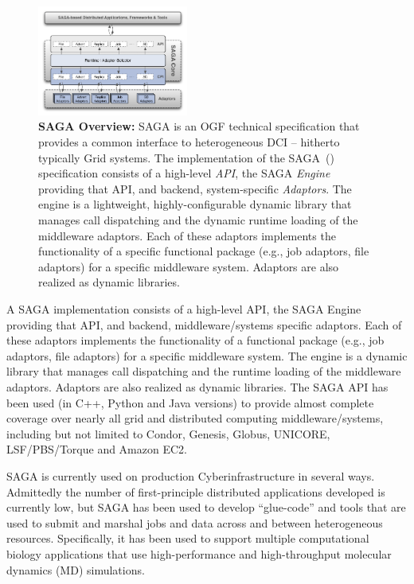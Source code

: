 \documentclass{sig-alternate}
\begin{document}
\begin{figure}[t]
\centering
\includegraphics[width=0.44\textwidth]{./figs/saga-architecture-1}
\caption{\textbf{SAGA Overview: } SAGA is an OGF technical
  specification that provides a common interface to heterogeneous DCI
  -- hitherto typically Grid systems.  The implementation of the
  SAGA~(\cite{saga_url}) specification consists of a high-level {\it
    API}, the SAGA {\it Engine} providing that API, and backend,
  system-specific {\it Adaptors}.  The engine is a lightweight,
  highly-configurable dynamic library that manages call dispatching
  and the dynamic runtime loading of the middleware adaptors.  Each of
  these adaptors implements the functionality of a specific functional
  package (e.g., job adaptors, file adaptors) for a specific
  middleware system. Adaptors are also realized as dynamic libraries.}
 \label{fig:saga-overview}
\end{figure}

A SAGA implementation consists of a high-level API, the SAGA
Engine providing that API, and backend, middleware/systems specific
adaptors. Each of these adaptors implements the functionality of
a functional package (e.g., job adaptors, file adaptors) for a
specific middleware system. The engine is a dynamic library that
manages call dispatching and the runtime loading of the middleware
adaptors. Adaptors are also realized as dynamic libraries. The SAGA
API has been used (in C++, Python and Java versions) to provide almost
complete coverage over nearly all grid and distributed computing
middleware/systems, including but not limited to Condor, Genesis,
Globus, UNICORE, LSF/PBS/Torque and Amazon EC2.

SAGA is currently used on production Cyberinfrastructure in several
ways. Admittedly the number of first-principle distributed
applications developed is currently low, but SAGA has been used to develop
``glue-code'' and tools that are used to submit and marshal jobs and
data across and between heterogeneous resources. Specifically, it has
been used to support multiple computational biology applications that
use high-performance and high-throughput molecular dynamics (MD)
simulations.
\end{document}
